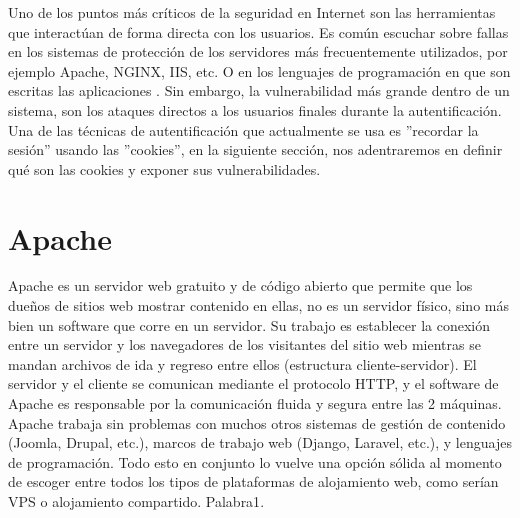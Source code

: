 \documentclass[12pt, a4paper, titlepage]{report}
\begin{document}
		Uno de los puntos más críticos de la seguridad en Internet son las herramientas que interactúan de forma directa con los usuarios. Es común escuchar sobre fallas en los sistemas de protección de los servidores más frecuentemente utilizados, por ejemplo Apache, NGINX, IIS, etc. O en los lenguajes de programación en que son escritas las aplicaciones \cite{refSeguridadWeb}. Sin embargo, la vulnerabilidad más grande dentro de un sistema, son los ataques directos a los usuarios finales durante la autentificación.\\
	    
	    Una de las técnicas de autentificación que actualmente se usa es ''recordar la sesión'' usando las ''cookies'', en la siguiente sección, nos adentraremos en definir qué son las cookies y exponer sus vulnerabilidades.
	    
	    \section{Apache}
	 	Apache es un servidor web gratuito y de código abierto que permite que los dueños de sitios web mostrar contenido en ellas, no es un servidor físico, sino más bien un software que corre en un servidor.
	 	Su trabajo es establecer la conexión entre un servidor y los navegadores de los visitantes del sitio web mientras se mandan archivos de ida y regreso entre ellos (estructura cliente-servidor). El servidor y el cliente se comunican mediante el protocolo HTTP, y el software de Apache es responsable por la comunicación fluida y segura entre las 2 máquinas.
	 	Apache trabaja sin problemas con muchos otros sistemas de gestión de contenido (Joomla, Drupal, etc.), marcos de trabajo web (Django, Laravel, etc.), y lenguajes de programación. Todo esto en conjunto lo vuelve una opción sólida al momento de escoger entre todos los tipos de plataformas de alojamiento web, como serían VPS o alojamiento compartido.
	 	 \Gls{Palabra1}. \\
		
\end{document}
